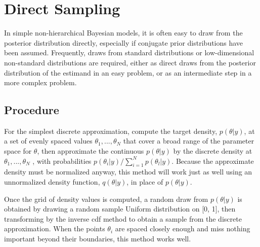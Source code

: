 \documentclass[a4paper, 9pt]{article}
\newcommand{\suml}{ \sum_{i=1}^N }
\begin{document}
\section{Direct Sampling}
In simple non-hierarchical Bayesian models, it is often easy to draw from the posterior distribution directly, especially if conjugate prior distributions have been assumed. Frequently, draws from standard distributions or low-dimensional non-standard distributions are required, either as direct draws from the posterior distribution of the estimand in an easy problem, or as an intermediate step in a more complex problem.

\subsection{Procedure}
For the simplest discrete approximation, compute the target density, $p(\theta|y)$, at a set of evenly spaced values $\theta_1,...,\theta_N$ that cover a broad range of the parameter space for $\theta$, then approximate the continuous $p(\theta|y)$ by the discrete density at $\theta_1,..., \theta_N$ , with probabilities ${p(\theta_i|y)}/{\suml p(\theta_l|y)} $. Because the approximate density must be normalized anyway, this method will work just as well using an unnormalized density function, $q(\theta|y)$, in place of $p(\theta|y)$.


Once the grid of density values is computed, a random draw from $p(\theta|y)$ is obtained by drawing a random sample Uniform distribution on [0, 1], then transforming by the inverse cdf method to obtain a sample from the discrete approximation. When the points $\theta_i$ are spaced closely enough and miss nothing important beyond their boundaries, this method works well. 


\end{document}
